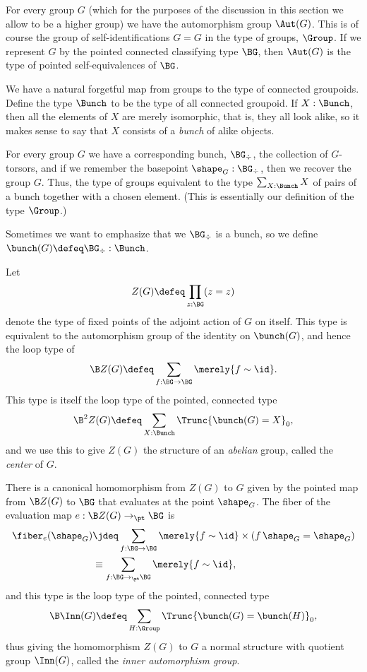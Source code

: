 For every group $G$ (which for the purposes of the discussion
in this section we allow to be a higher group)
we have the automorphism group $\Aut(G)$.
This is of course the group of self-identifications $G = G$ in the type of groups, $\Group$.
If we represent $G$ by the pointed connected classifying type $\BG$,
then $\Aut(G)$ is the type of pointed self-equivalences of $\BG$.

We have a natural forgetful map from groups to the type of connected groupoids.
Define the type $\Bunch$ to be the type of all connected groupoid.
If $X:\Bunch$, then all the elements of $X$ are merely isomorphic,
that is, they all look alike,
so it makes sense to say that $X$ consists of a \emph{bunch} of alike objects.

For every group $G$ we have a corresponding bunch, $\BG_\div$,
\ie{} the collection of $G$-torsors,
and if we remember the basepoint $\shape_G : \BG_\div$,
then we recover the group $G$.
Thus, the type of groups equivalent to the type
$\sum_{X : \Bunch} X$
of pairs of a bunch together with a chosen element.
(This is essentially our definition of the type $\Group$.)

Sometimes we want to emphasize that we $\BG_\div$ is a bunch,
so we define $\bunch(G) \defeq \BG_\div : \Bunch$.

\begin{definition}
  \label{def:center}
  Let
  $$Z(G) \defeq \prod_{z : \BG}(z = z)$$ denote the type of fixed points of the adjoint action of $G$ on itself.
  This type is equivalent to the automorphism group of the identity on $\bunch(G)$,
  and hence the loop type of
  \[
    \B Z(G) \defeq \sum_{f : \BG \to \BG} \merely{f \sim \id}.
  \]
  This type is itself the loop type of the pointed, connected type
  \[
    \B^2Z(G) \defeq \sum_{X : \Bunch}\Trunc{\bunch(G) = X}_0,
  \]
  and we use this to give $Z(G)$ the structure of an \emph{abelian} group,
  called the \emph{center} of $G$.
\end{definition}
There is a canonical homomorphism from $Z(G)$ to $G$ given by the pointed map
from $\B Z(G)$ to $\BG$ that evaluates at the point $\shape_G$.
The fiber of the evaluation map $e : \B Z(G) \to_\pt \BG$ is
\begin{align*}
  \fiber_e(\shape_G)
  &\jdeq \sum_{f : \BG \to \BG} \merely{f \sim \id} \times (\mathop f \shape_G = \shape_G) \\
  &\equiv \sum_{f : \BG \to_\pt \BG} \merely{f \sim \id},
\end{align*}
and this type is the loop type of the pointed, connected type
\[
  \B\Inn(G) \defeq \sum_{H : \Group} \Trunc{\bunch(G) = \bunch(H)}_0,
\]
thus giving the homomorphism $Z(G)$ to $G$ a normal structure with
quotient group $\Inn(G)$, called the \emph{inner automorphism group}.

